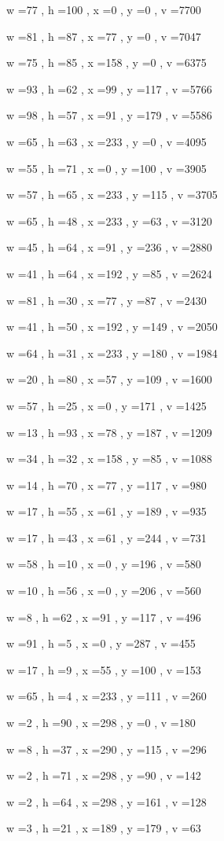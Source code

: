 \documentclass[11pt]{article}
\begin{document}
w =77 , h =100 , x =0 , y =0 , v =7700
\par
w =81 , h =87 , x =77 , y =0 , v =7047
\par
w =75 , h =85 , x =158 , y =0 , v =6375
\par
w =93 , h =62 , x =99 , y =117 , v =5766
\par
w =98 , h =57 , x =91 , y =179 , v =5586
\par
w =65 , h =63 , x =233 , y =0 , v =4095
\par
w =55 , h =71 , x =0 , y =100 , v =3905
\par
w =57 , h =65 , x =233 , y =115 , v =3705
\par
w =65 , h =48 , x =233 , y =63 , v =3120
\par
w =45 , h =64 , x =91 , y =236 , v =2880
\par
w =41 , h =64 , x =192 , y =85 , v =2624
\par
w =81 , h =30 , x =77 , y =87 , v =2430
\par
w =41 , h =50 , x =192 , y =149 , v =2050
\par
w =64 , h =31 , x =233 , y =180 , v =1984
\par
w =20 , h =80 , x =57 , y =109 , v =1600
\par
w =57 , h =25 , x =0 , y =171 , v =1425
\par
w =13 , h =93 , x =78 , y =187 , v =1209
\par
w =34 , h =32 , x =158 , y =85 , v =1088
\par
w =14 , h =70 , x =77 , y =117 , v =980
\par
w =17 , h =55 , x =61 , y =189 , v =935
\par
w =17 , h =43 , x =61 , y =244 , v =731
\par
w =58 , h =10 , x =0 , y =196 , v =580
\par
w =10 , h =56 , x =0 , y =206 , v =560
\par
w =8 , h =62 , x =91 , y =117 , v =496
\par
w =91 , h =5 , x =0 , y =287 , v =455
\par
w =17 , h =9 , x =55 , y =100 , v =153
\par
w =65 , h =4 , x =233 , y =111 , v =260
\par
w =2 , h =90 , x =298 , y =0 , v =180
\par
w =8 , h =37 , x =290 , y =115 , v =296
\par
w =2 , h =71 , x =298 , y =90 , v =142
\par
w =2 , h =64 , x =298 , y =161 , v =128
\par
w =3 , h =21 , x =189 , y =179 , v =63
\par
\newpage
\end{document}

